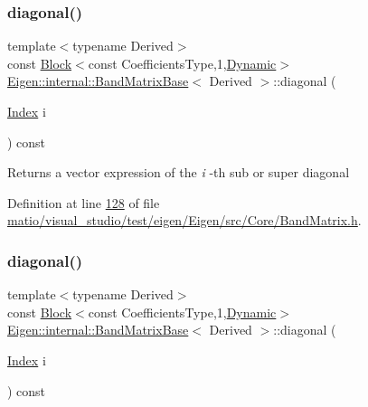 \subsubsection{\texorpdfstring{diagonal()}{diagonal()}\hspace{0.1cm}{\footnotesize\ttfamily [11/12]}}
{\footnotesize\ttfamily template$<$typename Derived$>$ \\
const \hyperlink{group___core___module_class_eigen_1_1_block}{Block}$<$const Coefficients\+Type,1,\hyperlink{namespace_eigen_ad81fa7195215a0ce30017dfac309f0b2}{Dynamic}$>$ \hyperlink{class_eigen_1_1internal_1_1_band_matrix_base}{Eigen\+::internal\+::\+Band\+Matrix\+Base}$<$ Derived $>$\+::diagonal (\begin{DoxyParamCaption}\item[{\hyperlink{group___core___module_a554f30542cc2316add4b1ea0a492ff02}{Index}}]{i }\end{DoxyParamCaption}) const\hspace{0.3cm}{\ttfamily [inline]}}

\begin{DoxyReturn}{Returns}
a vector expression of the {\itshape i} -\/th sub or super diagonal 
\end{DoxyReturn}


Definition at line \hyperlink{matio_2visual__studio_2test_2eigen_2_eigen_2src_2_core_2_band_matrix_8h_source_l00128}{128} of file \hyperlink{matio_2visual__studio_2test_2eigen_2_eigen_2src_2_core_2_band_matrix_8h_source}{matio/visual\+\_\+studio/test/eigen/\+Eigen/src/\+Core/\+Band\+Matrix.\+h}.

\mbox{\label{class_eigen_1_1internal_1_1_band_matrix_base_a8f7146e80405018d6d0827c4a7713ad3}} 
\subsubsection{\texorpdfstring{diagonal()}{diagonal()}\hspace{0.1cm}{\footnotesize\ttfamily [12/12]}}
{\footnotesize\ttfamily template$<$typename Derived$>$ \\
const \hyperlink{group___core___module_class_eigen_1_1_block}{Block}$<$const Coefficients\+Type,1,\hyperlink{namespace_eigen_ad81fa7195215a0ce30017dfac309f0b2}{Dynamic}$>$ \hyperlink{class_eigen_1_1internal_1_1_band_matrix_base}{Eigen\+::internal\+::\+Band\+Matrix\+Base}$<$ Derived $>$\+::diagonal (\begin{DoxyParamCaption}\item[{\hyperlink{group___core___module_a554f30542cc2316add4b1ea0a492ff02}{Index}}]{i }\end{DoxyParamCaption}) const\hspace{0.3cm}{\ttfamily [inline]}}

